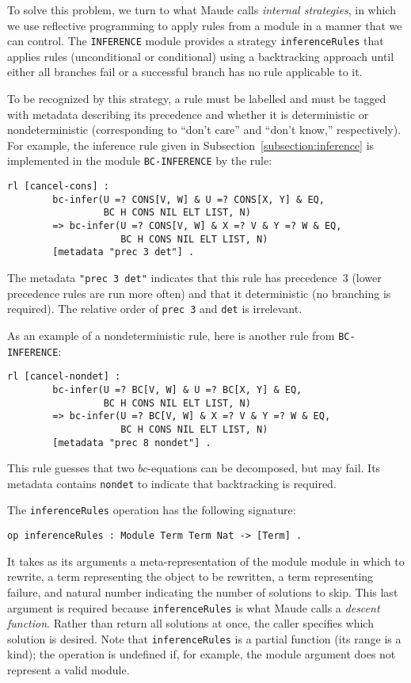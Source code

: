 \documentclass[11pt,twoside,titlepage]{article}
\newcommand{\Bc}{\mathit{bc}}
\begin{document}
To solve this problem, we turn to what Maude calls \emph{internal strategies},
in which we use reflective programming to apply rules from a module in a manner
that we can control. The \lstinline|INFERENCE| module provides a strategy
\lstinline|inferenceRules| that applies rules (unconditional or conditional)
using a backtracking approach until either all branches fail or a successful
branch has no rule applicable to it.

To be recognized by this strategy, a rule must be labelled and must be tagged
with metadata describing its precedence and whether it is deterministic or
nondeterministic (corresponding to ``don't care'' and ``don't know,''
respectively). For example, the inference rule given in
Subsection~\ref{subsection:inference} is implemented in the module
\lstinline|BC-INFERENCE| by the rule:
\begin{lstlisting}[language=Maude, style=smalllisting]
    rl [cancel-cons] :
        bc-infer(U =? CONS[V, W] & U =? CONS[X, Y] & EQ,
                 BC H CONS NIL ELT LIST, N)
        => bc-infer(U =? CONS[V, W] & X =? V & Y =? W & EQ,
                    BC H CONS NIL ELT LIST, N)
        [metadata "prec 3 det"] .
\end{lstlisting}
The metadata \lstinline|"prec 3 det"| indicates that this rule has precedence~3
(lower precedence rules are run more often) and that it deterministic (no
branching is required). The relative order of \lstinline|prec 3| and
\lstinline|det| is irrelevant.

As an example of a nondeterministic rule, here is another rule from
\lstinline|BC-INFERENCE|:
\begin{lstlisting}[language=Maude, style=smalllisting]
    rl [cancel-nondet] :
        bc-infer(U =? BC[V, W] & U =? BC[X, Y] & EQ,
                 BC H CONS NIL ELT LIST, N)
        => bc-infer(U =? BC[V, W] & X =? V & Y =? W & EQ,
                    BC H CONS NIL ELT LIST, N)
        [metadata "prec 8 nondet"] .
\end{lstlisting}
This rule guesses that two $\Bc$-equations can be decomposed, but may fail. Its
metadata contains \lstinline|nondet| to indicate that backtracking is required.

The \lstinline|inferenceRules| operation has the following signature:
\begin{lstlisting}[language=Maude, style=smalllisting]
    op inferenceRules : Module Term Term Nat -> [Term] .
\end{lstlisting}
It takes as its arguments a meta-representation of the module module in which
to rewrite, a term representing the object to be rewritten, a term representing
failure, and natural number indicating the number of solutions to skip. This
last argument is required because \lstinline|inferenceRules| is what Maude
calls a \emph{descent function}. Rather than return all solutions at once, the
caller specifies which solution is desired. Note that
\lstinline|inferenceRules| is a partial function (its range is a kind); the
operation is undefined if, for example, the module argument does not represent
a valid module.
\end{document}
